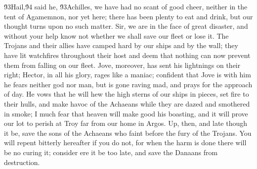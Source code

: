 {\'93Hail,\'94 said he, \'93Achilles, we have had no scant of good cheer, neither in the tent of Agamemnon, nor yet here; there has been plenty to eat and drink, but our thought turns upon no such matter. Sir, we are in the face of great disaster, and without your help know not whether we shall save our fleet or lose it. The Trojans and their allies have camped hard by our ships and by the wall; they have lit watchfires throughout their host and deem that nothing can now prevent them from falling on our fleet. Jove, moreover, has sent his lightnings on their right; Hector, in all his glory, rages like a maniac; confident that Jove is with him he fears neither god nor man, but is gone raving mad, and prays for the approach of day. He vows that he will hew the high sterns of our ships in pieces, set fire to their hulls, and make havoc of the Achaeans while they are dazed and smothered in smoke; I much fear that heaven will make good his boasting, and it will prove our lot to perish at Troy far from our home in Argos. Up, then, and late though it be, save the sons of the Achaeans who faint before the fury of the Trojans. You will repent bitterly hereafter if you do not, for when the harm is done there will be no curing it; consider ere it be too late, and save the Danaans from destruction.\
}

